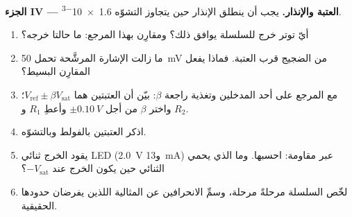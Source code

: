 \begin{problem}
\medskip
\noindent\textbf{الجزء IV --- العتبة والإنذار.}
يجب أن ينطلق الإنذار حين يتجاوز التشوّه \num{1.6e-3}.
\begin{enumerate}[resume]
  \item أيّ توتر خرج للسلسلة يوافق ذلك؟ ومقارِن
        بهذا المرجع: ما حالتا خرجه؟
  \item ما زالت الإشارة المرشَّحة تحمل \qty{50}{mV} من الضجيج قرب
        العتبة. فماذا يفعل المقارِن البسيط؟
  \item {} مع المرجع على أحد المدخلين وتغذية راجعة
        $\beta$: بيّن أن العتبتين هما $V_{\mathrm{ref}} \pm
        \beta V_{\mathrm{sat}}$؛ واختر $\beta$ من أجل $\pm\qty{0.10}{V}$
        وأعطِ $R_1$ و $R_2$.
  \item اذكر العتبتين بالفولط وبالتشوّه.
  \item يقود الخرج ثنائي LED (\qty{2.0}{V} و\qty{13}{mA}) عبر
        مقاومة: احسبها. وما الذي يحمي الثنائي حين يكون الخرج
        عند $-V_{\mathrm{sat}}$؟
  \item لخّص السلسلة مرحلةً مرحلة، وسمِّ الانحرافين عن
        المثالية اللذين يفرضان حدودها الحقيقية.
\end{enumerate}
\end{problem}
